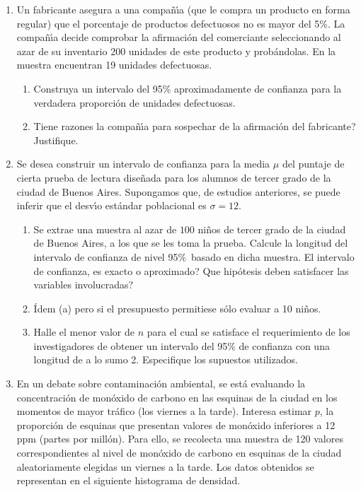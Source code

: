 \documentclass[11pt,a4paper,twoside]{article}%
\begin{document}
\begin{enumerate}
\item Un fabricante asegura a una compa\~{n}\'{\i}a (que le compra un
producto en forma regular) que el porcentaje de productos defectuosos no es
mayor del 5\%. La compa\~{n}\'{\i}a decide comprobar la afirmaci\'{o}n del
comerciante seleccionando al azar de su inventario 200 unidades de este
producto y prob\'{a}ndolas. En la muestra encuentran 19 unidades defectuosas.

\begin{enumerate}
\item Construya un intervalo del 95\% aproximadamente de confianza para la
verdadera proporci\'{o}n de unidades defectuosas.

\item \textquestiondown Tiene razones la compa\~{n}\'{\i}a para sospechar de
la afirmaci\'{o}n del fabricante? Justifique.
\end{enumerate}


\item Se desea construir un intervalo de confianza para la media $\mu$
del puntaje de cierta prueba de lectura dise\~{n}ada para los alumnos de
tercer grado de la ciudad de Buenos Aires. Supongamos que, de estudios
anteriores, se puede inferir que el desv\'{\i}o est\'{a}ndar poblacional es
$\sigma=12.$

\begin{enumerate}
\item Se extrae una muestra al azar de $100$ ni\~{n}os de tercer grado de la
ciudad de Buenos Aires, a los que se les toma la prueba. Calcule la longitud
del intervalo de confianza de nivel 95\%\ basado en dicha muestra. El
intervalo de confianza, \textquestiondown es exacto o aproximado?
\textquestiondown Que hip\'{o}tesis deben satisfacer las variables involucradas?

\item \'{I}dem (a) pero si el presupuesto permitiese s\'{o}lo evaluar a 10 ni\~{n}os.

\item Halle el menor valor de $n$ para el cual se satisface el requerimiento
de los investigadores de obtener un intervalo del 95\% de confianza con una
longitud de a lo sumo 2. Especifique los supuestos utilizados.
\end{enumerate}

\item En un debate sobre contaminaci\'{o}n ambiental, se est\'{a}
evaluando la concentraci\'{o}n de mon\'{o}xido de carbono en las esquinas de
la ciudad en los momentos de mayor tr\'{a}fico (los viernes a la tarde).
Interesa estimar $p$, la proporci\'{o}n de esquinas que presentan valores de
mon\'{o}xido inferiores a 12 ppm (partes por mill\'{o}n). Para ello, se
recolecta una muestra de 120 valores correspondientes al nivel de mon\'{o}xido
de carbono en esquinas de la ciudad aleatoriamente elegidas un viernes a la
tarde. Los datos obtenidos se representan en el siguiente histograma de
densidad.%


\end{enumerate}
\end{document}
